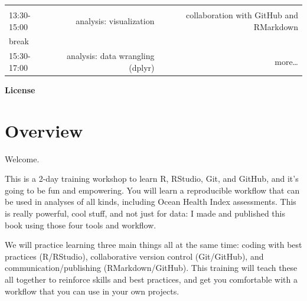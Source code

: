 \documentclass[]{book}
\theoremstyle{definition}
\theoremstyle{definition}
\theoremstyle{definition}
\theoremstyle{remark}
\begin{document}
\begin{longtable}[]{@{}lrr@{}}
\begin{minipage}[t]{0.15\columnwidth}
\strut
\end{minipage}\tabularnewline
\begin{minipage}[t]{0.15\columnwidth}\raggedright\strut
13:30-15:00\strut
\end{minipage} & \begin{minipage}[t]{0.15\columnwidth}\raggedleft\strut
analysis: visualization\strut
\end{minipage} & \begin{minipage}[t]{0.15\columnwidth}\raggedleft\strut
collaboration with GitHub and RMarkdown\strut
\end{minipage}\tabularnewline
\begin{minipage}[t]{0.15\columnwidth}\raggedright\strut
break\strut
\end{minipage} & \begin{minipage}[t]{0.15\columnwidth}\raggedleft\strut
\strut
\end{minipage} & \begin{minipage}[t]{0.15\columnwidth}\raggedleft\strut
\strut
\end{minipage}\tabularnewline
\begin{minipage}[t]{0.15\columnwidth}\raggedright\strut
15:30-17:00\strut
\end{minipage} & \begin{minipage}[t]{0.15\columnwidth}\raggedleft\strut
analysis: data wrangling (dplyr)\strut
\end{minipage} & \begin{minipage}[t]{0.15\columnwidth}\raggedleft\strut
more\ldots{}\strut
\end{minipage}\tabularnewline
\bottomrule
\end{longtable}

\textbf{License}

\chapter{Overview}\label{overview}

Welcome.

This is a 2-day training workshop to learn R, RStudio, Git, and GitHub,
and it's going to be fun and empowering. You will learn a reproducible
workflow that can be used in analyses of all kinds, including Ocean
Health Index assessments. This is really powerful, cool stuff, and not
just for data: I made and published this book using those four tools and
workflow.

We will practice learning three main things all at the same time: coding
with best practices (R/RStudio), collaborative version control
(Git/GitHub), and communication/publishing (RMarkdown/GitHub). This
training will teach these all together to reinforce skills and best
practices, and get you comfortable with a workflow that you can use in
your own projects.
\end{document}
